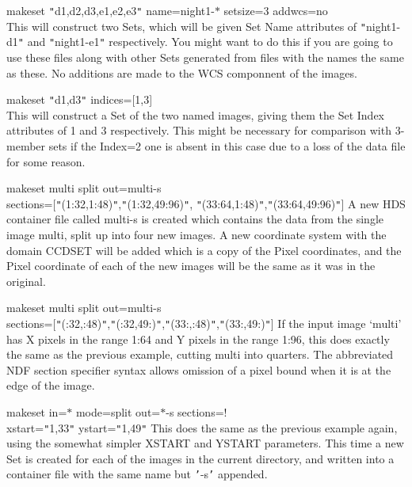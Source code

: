 \documentclass[twoside,11pt]{article}
\renewcommand{\_}{\texttt{\symbol{95}}}
\newcommand{\sstexamplesubsection}[2]{\sloppy \item{\ssttt #1} \mbox{} \\ #2 }
\newcommand{\sstnotes}[1]{\item[Notes:] \mbox{} \\[1.3ex] #1}
\newcommand{\sstitemlist}[1]{
  \mbox{} \\
  \vspace{-3.5ex}
  \begin{itemize}
     #1
  \end{itemize}
}
\newcommand{\sstexamplesubsection}[2]{\item[{\ssttt #1}] #2}
\newcommand{\sstnotes}[1]{\item[Notes:] #1 }
\newcommand{\sstitemlist}[1]{
      \begin{itemize}
         #1
      \end{itemize}
      \\
   }
\begin{document}
{{{      }
      \sstexamplesubsection{
         makeset {\tt "}d1,d2,d3,e1,e2,e3{\tt "} name=night1-$*$ setsize=3 addwcs=no
      }{
         This will construct two Sets, which will be given Set Name
         attributes of {\tt "}night1-d1{\tt "} and {\tt "}night1-e1{\tt "} respectively.
         You might want to do this if you are going to use these
         files along with other Sets generated from files with the
         names the same as these.  No additions are made to the
         WCS componnent of the images.
      }
      \sstexamplesubsection{
         makeset {\tt "}d1,d3{\tt "} indices=[1,3]
      }{
         This will construct a Set of the two named images, giving them
         the Set Index attributes of 1 and 3 respectively.  This
         might be necessary for comparison with 3-member sets if the
         Index=2 one is absent in this case due to a loss of the data
         file for some reason.
      }
      \sstexamplesubsection{
         makeset multi split out=multi-s
      }{
              sections=[{\tt "}(1:32,1:48){\tt "},{\tt "}(1:32,49:96){\tt "},
                        {\tt "}(33:64,1:48){\tt "},{\tt "}(33:64,49:96){\tt "}]
         A new HDS container file called multi-s is created which
         contains the data from the single image multi, split up
         into four new images.  A new coordinate system with the
         domain CCD\_SET will be added which is a copy of the
         Pixel coordinates, and the Pixel coordinate of each of
         the new images will be the same as it was in the original.
      }
      \sstexamplesubsection{
         makeset multi split out=multi-s
      }{
              sections=[{\tt "}(:32,:48){\tt "},{\tt "}(:32,49:){\tt "},{\tt "}(33:,:48){\tt "},{\tt "}(33:,49:){\tt "}]
         If the input image `multi' has X pixels in the range 1:64 and
         Y pixels in the range 1:96, this does exactly the same as
         the previous example, cutting multi into quarters.  The
         abbreviated NDF section specifier syntax allows omission
         of a pixel bound when it is at the edge of the image.
      }
      \sstexamplesubsection{
         makeset in=$*$ mode=split out=$*$-s sections=!
      }{
              xstart={\tt "}1,33{\tt "} ystart={\tt "}1,49{\tt "}
         This does the same as the previous example again, using the
         somewhat simpler XSTART and YSTART parameters.  This time
         a new Set is created for each of the images in the current
         directory, and written into a container file with the
         same name but {\tt '}-s{\tt '} appended.
      }
   }
   \sstnotes{
      \sstitemlist{

}}}
\end{document}
